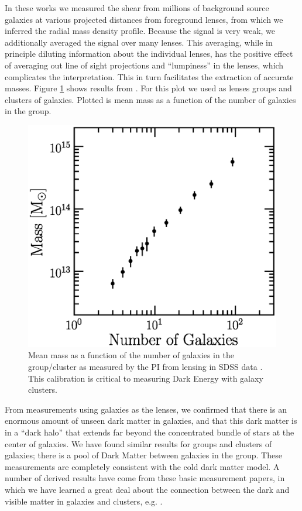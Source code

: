 \documentclass[12pt]{article}
\begin{document}
In these works we measured the shear from millions of background source
galaxies at various projected distances from foreground lenses, from which we
inferred the radial mass density profile.  Because the signal is very weak, we
additionally averaged the signal over many lenses.  This averaging, while in
principle diluting information about the individual lenses, has the positive
effect of averaging out line of sight projections and ``lumpiness'' in the
lenses, which complicates the interpretation.  This in turn facilitates the
extraction of accurate masses.  Figure \ref{fig:massngals} shows results from
\cite{SheldonLensing07,JohnstonLensing07}. For this plot we used as lenses
groups and clusters of galaxies.  Plotted is mean mass as a function of the
number of galaxies in the group.  

\begin{figure}[p]
\centering
\includegraphics[scale=0.7]{mass-rich-plot.eps}
\caption{Mean mass as a function of the number of
galaxies in the group/cluster as measured by the PI from lensing in SDSS
data \cite{SheldonLensing07,JohnstonLensing07}. This calibration
is critical to measuring Dark Energy with galaxy clusters.\label{fig:massngals}}
\end{figure}




From measurements using galaxies as the lenses, we confirmed that there is an
enormous amount of unseen dark matter in galaxies, and that this dark matter is
in a ``dark halo'' that extends far beyond the concentrated bundle of stars at
the center of galaxies.  We have found similar results for groups and clusters
of galaxies; there is a pool of Dark Matter between galaxies in the group.
These measurements are completely consistent with the cold dark matter model.
A number of derived results have come from these basic measurement papers, in
which we have learned a great deal about the connection between the dark and
visible matter in galaxies and clusters, e.g.
\cite{RykoffLXM08,RozoScatter09,TinkerM2N2012}. 
\end{document}
